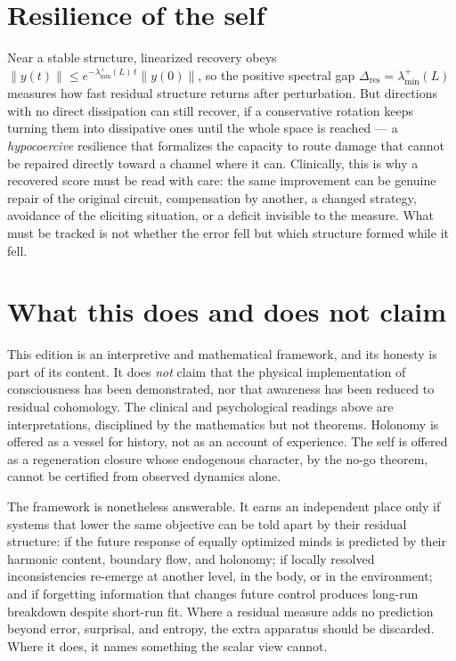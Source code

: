 \documentclass[11pt,a4paper]{article}
\theoremstyle{plain}
\begin{document}
\section{Resilience of the self}\label{sec:resilience}

Near a stable structure, linearized recovery obeys $\|y(t)\|\le e^{-\lambda^{+}_{\min}(L)\,t}\|y(0)\|$,
so the positive spectral gap $\Delta_{\mathrm{res}}=\lambda^{+}_{\min}(L)$ measures how fast residual
structure returns after perturbation. But directions with no direct dissipation can still recover, if a
conservative rotation keeps turning them into dissipative ones until the whole space is reached --- a
\emph{hypocoercive} resilience that formalizes the capacity to route damage that cannot be repaired
directly toward a channel where it can. Clinically, this is why a recovered score must be read with care:
the same improvement can be genuine repair of the original circuit, compensation by another, a changed
strategy, avoidance of the eliciting situation, or a deficit invisible to the measure. What must be
tracked is not whether the error fell but which structure formed while it fell.

\section{What this does and does not claim}\label{sec:claims}

This edition is an interpretive and mathematical framework, and its honesty is part of its content. It
does \emph{not} claim that the physical implementation of consciousness has been demonstrated, nor that
awareness has been reduced to residual cohomology. The clinical and psychological readings above are
interpretations, disciplined by the mathematics but not theorems. Holonomy is offered as a vessel for
history, not as an account of experience. The self is offered as a regeneration closure whose endogenous
character, by the no-go theorem, cannot be certified from observed dynamics alone.

The framework is nonetheless answerable. It earns an independent place only if systems that lower the
same objective can be told apart by their residual structure: if the future response of equally
optimized minds is predicted by their harmonic content, boundary flow, and holonomy; if locally resolved
inconsistencies re-emerge at another level, in the body, or in the environment; and if forgetting
information that changes future control produces long-run breakdown despite short-run fit. Where a
residual measure adds no prediction beyond error, surprisal, and entropy, the extra apparatus should be
discarded. Where it does, it names something the scalar view cannot.
\end{document}
